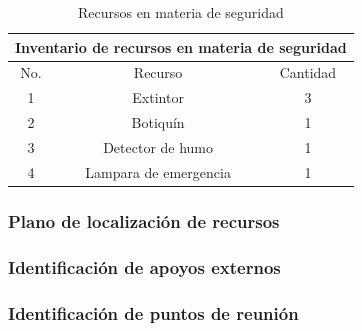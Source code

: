     \begin{table}[H]
        \centering
        \caption{Recursos en materia de seguridad}
        \begin{tabular}{c c c}
        \hline
        \multicolumn{3}{c}{Inventario de recursos en materia de seguridad}\\
        \hline
             No.& Recurso & Cantidad  \\
        \hline
             1& Extintor & 3  \\
        \hline
             2& Botiquín & 1  \\
        \hline
             3& Detector de humo & 1 \\
        \hline
             4& Lampara de emergencia & 1 \\
        \hline     
        \end{tabular}
        \label{tab:inventario}
    \end{table}
    \subsubsection{Plano de localización de recursos}
    
    \subsubsection{ Identificación de apoyos externos}
    
    \subsubsection{Identificación de puntos de reunión}
    
